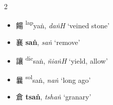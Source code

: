 \begin{multicols}{2}
\begin{itemize}



    \item {\Large{餳}} %
    {\large{{\textsuperscript{lap}}yaṅ}},
    \textit{daṅH} `veined stone' %
\end{itemize}

\vspace{2mm}

\begin{minipage}{\columnwidth}
\begin{itemize}[leftmargin=*, labelsep=0.5em]  
    \item {\Large{襄}} %
    {\large{\textbf{saṅ}}},
    \textit{saṅ} `remove' %

    \item {\Large{讓}} %
    {\large{{\textsuperscript{dic}}saṅ}},
    \textit{ñiaṅH} `yield, allow' %

    \item {\Large{曩}} %
    {\large{{\textsuperscript{sol}}saṅ}},
    \textit{naṅ} `long ago' %
\end{itemize}
\end{minipage}

\vspace{2mm}

\begin{itemize}
    \item {\Large{倉}} %
    {\large{\textbf{tsaṅ}}},
    \textit{tshaṅ} `granary' %




\end{itemize}
\end{multicols}
